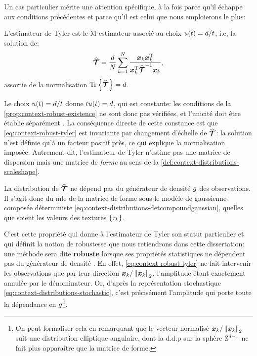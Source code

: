Un cas particulier mérite une attention spécifique, à la fois parce qu'il échappe aux conditions précédentes et parce qu'il est celui que nous emploierons le plus:

\begin{definition}
\label{def:context-robust-tyler}
  L'estimateur de Tyler  est le M-estimateur associé au choix $u(t)=d/t$, i.e, la solution de:
\begin{equation}
  \widehat{\bm{\mathcal{T}}}
  =
  \frac{d}{N}\sum_{k=1}^{N}
  \frac{\boldsymbol{x}_k\boldsymbol{x}_k^{\mathrm{T}}}{\boldsymbol{x}_k^{\mathrm{T}} {\widehat{\bm{\mathcal{T}}}}^{-1} \boldsymbol{x}_k},
  \label{eq:context-robust-tyler}
\end{equation}
  assortie de la normalisation $\operatorname{\operatorname{Tr}}\left\{\widehat{\bm{\mathcal{T}}}\right\}=d$.
\end{definition}

\begin{remark}
  Le choix $u(t)=d/t$ donne $tu(t)=d$, qui est constante: les conditions de la \cref{prop:context-robust-existence} ne sont donc pas vérifiées, et l'unicité doit être établie séparément \cite{Pascal08a}. La conséquence directe de cette constance est que \cref{eq:context-robust-tyler} est invariante par changement d'échelle de $\widehat{\bm{\mathcal{T}}}$: la solution n'est définie qu'à un facteur positif près, ce qui explique la normalisation imposée. Autrement dit, l'estimateur de Tyler n'estime pas une matrice de dispersion mais une matrice de \emph{forme} au sens de la \cref{def:context-distributions-scaleshape}.
\end{remark}

\begin{property}
\label{prop:context-robust-distributionfree}
  La distribution de $\widehat{\bm{\mathcal{T}}}$ ne dépend pas du générateur de densité $g$ des observations. Il s'agit donc du mle de la matrice de forme sous le modèle de gaussienne-composée déterministe \cref{eq:context-distributions-detcompoundgaussian}, quelles que soient les valeurs des textures $\{\tau_k\}$.
\end{property}

\begin{remark}
  C'est cette propriété qui donne à l'estimateur de Tyler son statut particulier et qui définit la notion de robustesse que nous retiendrons dans cette dissertation: une méthode sera dite \textbf{robuste} lorsque ses propriétés statistiques ne dépendent pas du générateur de densité . En effet, \cref{eq:context-robust-tyler} ne fait intervenir les observations que par leur direction $\boldsymbol{x}_k/\left\lVert\boldsymbol{x}_k\right\rVert_2$, l'amplitude étant exactement annulée par le dénominateur. Or, d'après la représentation stochastique \cref{eq:context-distributions-stochastic}, c'est précisément l'amplitude qui porte toute la dépendance en $g$\footnote{On peut formaliser cela en remarquant que le vecteur normalisé $\boldsymbol{x}_k/\left\lVert\boldsymbol{x}_k\right\rVert_2$ suit une distribution elliptique angulaire, dont la d.d.p sur la sphère $\mathbb{S}^{d-1}$ ne fait plus apparaître que la matrice de forme.}.
\end{remark}

